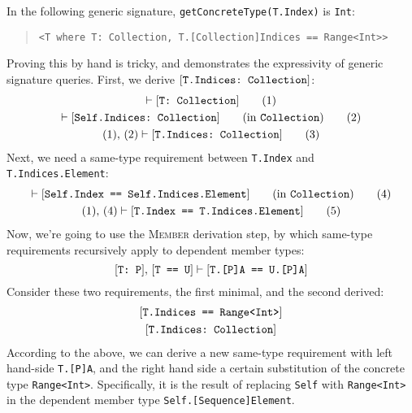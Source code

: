 \documentclass[../generics]{subfiles}
\begin{document}
\begin{example}\label{concrete type query example}
In the following generic signature, \texttt{getConcreteType(T.Index)} is \texttt{Int}:
\begin{quote}
\begin{verbatim}
<T where T: Collection, T.[Collection]Indices == Range<Int>>
\end{verbatim}
\end{quote}
Proving this by hand is tricky, and demonstrates the expressivity of generic signature queries. First, we derive $[\texttt{T.Indices:~Collection}]$:
\begin{gather}
\vdash [\texttt{T:~Collection}]\tag{1}\\
\vdash [\texttt{Self.Indices:~Collection}]\qquad\mbox{(in \texttt{Collection})}\tag{2}\\
(1),\,(2)\vdash[\texttt{T.Indices:~Collection}]\tag{3}
\end{gather}
Next, we need a same-type requirement between \texttt{T.Index} and \texttt{T.Indices.Element}:
\begin{gather}
\vdash [\texttt{Self.Index == Self.Indices.Element}]\qquad\mbox{(in \texttt{Collection})}\tag{4}\\
(1),\,(4)\vdash [\texttt{T.Index == T.Indices.Element}]\tag{5}
\end{gather}
Now, we're going to use the \textsc{Member} derivation step, by which same-type requirements recursively apply to dependent member types:
\[[\texttt{T:~P}],\,[\texttt{T == U}]\vdash[\texttt{T.[P]A == U.[P]A}]\]
Consider these two requirements, the first minimal, and the second derived:
\begin{gather*}
\FormalReq{T.Indices == Range<Int>}\\
\FormalReq{T.Indices:~Collection}
\end{gather*}
According to the above, we can derive a new same-type requirement with left hand-side \texttt{T.[P]A}, and the right hand side a certain substitution of the concrete type \texttt{Range<Int>}. Specifically, it is the result of replacing \texttt{Self} with \texttt{Range<Int>} in the dependent member type \texttt{Self.[Sequence]Element}.


\end{example}
\end{document}

